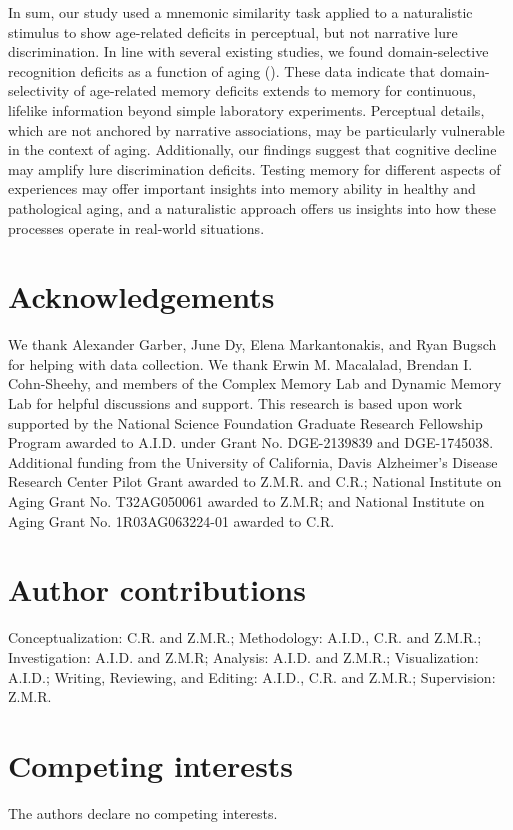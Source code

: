 \documentclass[11pt]{article}
\begin{document}
In sum, our study used a mnemonic similarity task applied to a naturalistic stimulus to show age-related deficits in perceptual, but not narrative lure discrimination. In line with several existing studies, we found domain-selective recognition deficits as a function of aging (\cite{gusten_age_2021, reagh_greater_2016, reagh_functional_2018}). These data indicate that domain-selectivity of age-related memory deficits extends to memory for continuous, lifelike information beyond simple laboratory experiments. Perceptual details, which are not anchored by narrative associations, may be particularly vulnerable in the context of aging. Additionally, our findings suggest that cognitive decline may amplify lure discrimination deficits. Testing memory for different aspects of experiences may offer important insights into memory ability in healthy and pathological aging, and a naturalistic approach offers us insights into how these processes operate in real-world situations.

\printbibliography

\section*{Acknowledgements}
We thank Alexander Garber, June Dy, Elena Markantonakis, and Ryan Bugsch for helping with data collection. We thank Erwin M. Macalalad, Brendan I. Cohn-Sheehy, and members of the Complex Memory Lab and Dynamic Memory Lab for helpful discussions and support. This research is based upon work supported by the National Science Foundation Graduate Research Fellowship Program awarded to A.I.D. under Grant No. DGE-2139839 and DGE-1745038. Additional funding from the University of California, Davis Alzheimer's Disease Research Center Pilot Grant awarded to Z.M.R. and C.R.; National Institute on Aging Grant No. T32AG050061 awarded to Z.M.R; and National Institute on Aging Grant No. 1R03AG063224-01 awarded to C.R.

\section*{Author contributions}
Conceptualization: C.R. and Z.M.R.; Methodology: A.I.D., C.R. and Z.M.R.; Investigation: A.I.D. and Z.M.R; Analysis: A.I.D. and Z.M.R.; Visualization: A.I.D.; Writing, Reviewing, and Editing: A.I.D., C.R. and Z.M.R.; Supervision: Z.M.R.

\section*{Competing interests}
The authors declare no competing interests.
\end{document}
